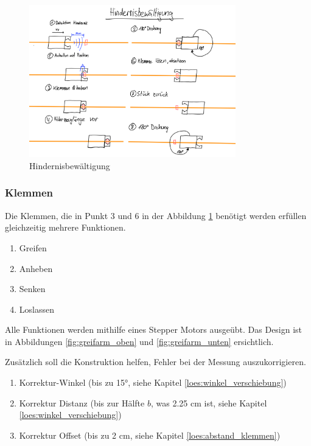 \documentclass[../main.tex]{subfiles}
\begin{document}
\begin{figure}[H]
\centering
\includegraphics[width=0.8\textwidth]{img/lösungskonzpet/Skizzen/Skizze_Hindernisbewältigung.png}
\caption{Hindernisbewältigung}
\label{img:Skizze_Hindernisbewältigung}
\end{figure}


\subsubsection{Klemmen}
Die Klemmen, die in Punkt 3 und 6 in der Abbildung \ref{img:Skizze_Hindernisbewältigung} benötigt werden erfüllen gleichzeitig mehrere Funktionen.

\begin{enumerate}
    \item Greifen
    \item Anheben
    \item Senken
    \item Loslassen
\end{enumerate}

Alle Funktionen werden mithilfe eines Stepper Motors ausgeübt. Das Design ist in Abbildungen \ref{fig:greifarm_oben} und \ref{fig:greifarm_unten} ersichtlich.
\newline

Zusätzlich soll die Konstruktion helfen, Fehler bei der Messung auszukorrigieren.
\begin{enumerate}
    \item Korrektur-Winkel (bis zu 15°, siehe Kapitel \ref{loes:winkel_verschiebung})
    \item Korrektur Distanz (bis zur Hälfte $b$, was 2.25 cm ist, siehe Kapitel \ref{loes:winkel_verschiebung})
    \item Korrektur Offset (bis zu 2 cm, siehe Kapitel \ref{loes:abstand_klemmen})
\end{enumerate}
\end{document}
